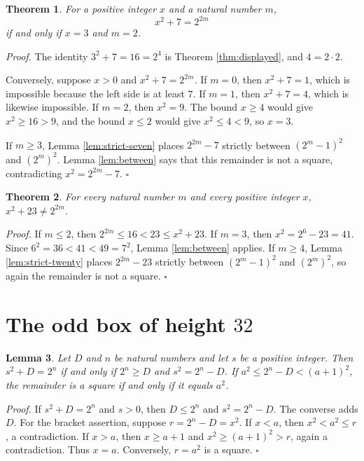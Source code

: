 \documentclass[11pt,letterpaper]{article}
\newtheorem{theorem}{Theorem}
\newtheorem{lemma}[theorem]{Lemma}
\newenvironment{proof}{\noindent\textit{Proof.}}{\hfill\(\square\)}
\begin{document}
\begin{theorem}
\label{thm:even-seven}
For a positive integer \(x\) and a natural number \(m\),
\[
x^2+7=2^{2m}
\]
if and only if \(x=3\) and \(m=2\).
\end{theorem}

\begin{proof}
The identity \(3^2+7=16=2^4\) is Theorem \ref{thm:displayed}, and \(4=2\cdot 2\).

Conversely, suppose \(x>0\) and \(x^2+7=2^{2m}\). If \(m=0\), then \(x^2+7=1\), which is impossible because the left side is at least \(7\). If \(m=1\), then \(x^2+7=4\), which is likewise impossible. If \(m=2\), then \(x^2=9\). The bound \(x\ge 4\) would give \(x^2\ge 16>9\), and the bound \(x\le 2\) would give \(x^2\le 4<9\), so \(x=3\).

If \(m\ge 3\), Lemma \ref{lem:strict-seven} places \(2^{2m}-7\) strictly between \((2^m-1)^2\) and \((2^m)^2\). Lemma \ref{lem:between} says that this remainder is not a square, contradicting \(x^2=2^{2m}-7\).
\end{proof}

\begin{theorem}
\label{thm:even-twenty}
For every natural number \(m\) and every positive integer \(x\), \(x^2+23\neq 2^{2m}\).
\end{theorem}

\begin{proof}
If \(m\le 2\), then \(2^{2m}\le 16<23\le x^2+23\). If \(m=3\), then \(x^2=2^6-23=41\). Since \(6^2=36<41<49=7^2\), Lemma \ref{lem:between} applies. If \(m\ge 4\), Lemma \ref{lem:strict-twenty} places \(2^{2m}-23\) strictly between \((2^m-1)^2\) and \((2^m)^2\), so again the remainder is not a square.
\end{proof}

\section{The odd box of height \(32\)}

\begin{lemma}
\label{lem:root}
Let \(D\) and \(n\) be natural numbers and let \(s\) be a positive integer. Then \(s^2+D=2^n\) if and only if \(2^n\ge D\) and \(s^2=2^n-D\). If \(a^2\le 2^n-D<(a+1)^2\), the remainder is a square if and only if it equals \(a^2\).
\end{lemma}

\begin{proof}
If \(s^2+D=2^n\) and \(s>0\), then \(D\le 2^n\) and \(s^2=2^n-D\). The converse adds \(D\). For the bracket assertion, suppose \(r=2^n-D=x^2\). If \(x<a\), then \(x^2<a^2\le r\), a contradiction. If \(x>a\), then \(x\ge a+1\) and \(x^2\ge(a+1)^2>r\), again a contradiction. Thus \(x=a\). Conversely, \(r=a^2\) is a square.
\end{proof}
\end{document}
